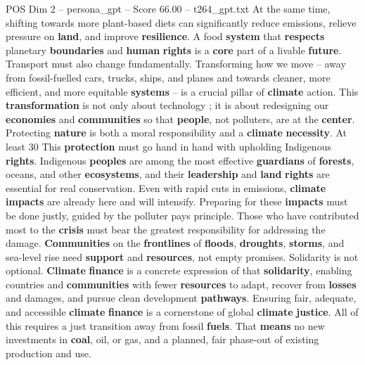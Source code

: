 \begin{textsample}{POS Dim 2 – persona\_gpt – Score 66.00 – t264\_gpt.txt}
At the same time, shifting towards more plant-based diets can significantly reduce emissions, relieve pressure on \textbf{land}, and improve \textbf{resilience}.
A food \textbf{system} that \textbf{respects} planetary \textbf{boundaries} and \textbf{human} \textbf{rights} is a \textbf{core} part of a livable \textbf{future}.
Transport must also change fundamentally.
Transforming how we move – away from fossil-fuelled cars, trucks, ships, and planes and towards cleaner, more efficient, and more equitable \textbf{systems} – is a crucial pillar of \textbf{climate} action.
This \textbf{transformation} is not only about technology ; it is about redesigning our \textbf{economies} and \textbf{communities} so that \textbf{people}, not polluters, are at the \textbf{center}.
Protecting \textbf{nature} is both a moral responsibility and a \textbf{climate} \textbf{necessity}.
At least 30 %
This \textbf{protection} must go hand in hand with upholding Indigenous \textbf{rights}.
Indigenous \textbf{peoples} are among the most effective \textbf{guardians} of \textbf{forests}, oceans, and other \textbf{ecosystems}, and their \textbf{leadership} and \textbf{land} \textbf{rights} are essential for real conservation.
Even with rapid cuts in emissions, \textbf{climate} \textbf{impacts} are already here and will intensify.
Preparing for these \textbf{impacts} must be done justly, guided by the polluter pays principle.
Those who have contributed most to the \textbf{crisis} must bear the greatest responsibility for addressing the damage. \textbf{Communities} on the \textbf{frontlines} of \textbf{floods}, \textbf{droughts}, \textbf{storms}, and sea-level rise need \textbf{support} and \textbf{resources}, not empty promises.
Solidarity is not optional. \textbf{Climate} \textbf{finance} is a concrete expression of that \textbf{solidarity}, enabling countries and \textbf{communities} with fewer \textbf{resources} to adapt, recover from \textbf{losses} and damages, and pursue clean development \textbf{pathways}.
Ensuring fair, adequate, and accessible \textbf{climate} \textbf{finance} is a cornerstone of global \textbf{climate} \textbf{justice}.
All of this requires a just transition away from fossil \textbf{fuels}.
That \textbf{means} no new investments in \textbf{coal}, oil, or gas, and a planned, fair phase-out of existing production and use.

\end{textsample}
